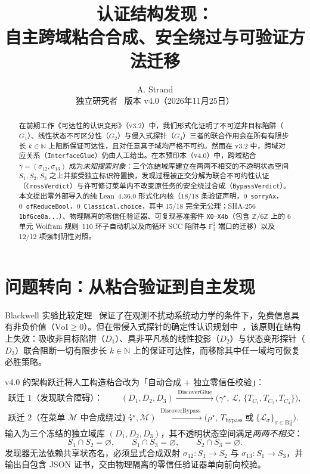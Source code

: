 \documentclass[10pt,a4paper]{article}
\title{\textbf{\Large 认证结构发现：}\\[4pt]
\large 自主跨域粘合合成、安全绕过与可验证方法迁移}
\author{A. Strand\\
\small 独立研究者 \textperiodcentered\ 版本 v4.0（2026年11月25日）}
\date{}
\newcommand{\code}[1]{\nolinkurl{#1}}
\begin{document}
\maketitle

\begin{abstract}
在前期工作《可达性的认识变形》（v3.2）中，我们形式化证明了不可逆非目标陷阱（$G_1$）、线性状态不可区分性（$G_2$）与侵入式探针（$G_4$）三者的联合作用会在所有有限步长 $k \in \mathbb{N}$ 上阻断保证可达性，且对任意真子域均严格不可约。然而在 v3.2 中，跨域对应关系（\code{InterfaceGlue}）仍由人工给出。在本预印本（v4.0）中，跨域粘合 $\gamma = (\sigma_{12}, \sigma_{13})$ 成为\emph{未知搜索对象}：三个冻结域库建立在两两不相交的不透明状态空间 $S_1, S_2, S_3$ 之上并接受独立标识符置换，发现过程被正交分解为联合不可约性认证（\code{CrossVerdict}）与许可修订菜单内不改变原任务的安全绕过合成（\code{BypassVerdict}）。本文提出零外部导入的纯 Lean~4.36.0 形式化内核（18/18 条验证声明，0~\code{sorryAx}，0~\code{ofReduceBool}，0~\code{Classical.choice}，其中 15/18 完全无公理；SHA-256 \code{1bf6ce8a...}）、物理隔离的零信任验证器、可复现基准套件 \texttt{X0}--\texttt{X4b}（包含 $\mathbb{Z}/6\mathbb{Z}$ 上的 6 单元 Wolfram 规则~110 环子自动机以及向循环 SCC 陷阱与 $\mathbb{F}_3^2$ 端口的迁移）以及 12/12 项强制阴性对照。
\end{abstract}

\section{问题转向：从粘合验证到自主发现}

Blackwell 实验比较定理~\cite{blackwell1953,howard1966} 保证了在观测不扰动系统动力学的条件下，免费信息具有非负价值（$\mathrm{VoI} \ge 0$）。但在带侵入式探针的确定性认识规划中~\cite{fagin1995,vanditmarsch2007,kaelbling1998,strand2026v32}，该原则在结构上失效：吸收非目标陷阱（$D_1$）、具非平凡核的线性投影（$D_2$）与状态变形探针（$D_3$）联合阻断一切有限步长 $k \in \mathbb{N}$ 上的保证可达性，而移除其中任一域均可恢复必胜策略。

v4.0 的架构跃迁将人工构造粘合改为「自动合成 + 独立零信任校验」：
\begin{align}\label{eq:pipeline}
\text{跃迁 1（发现联合障碍）：}\quad &
(D_1, D_2, D_3) \xrightarrow{\;\mathrm{DiscoverGlue}\;} \bigl(\gamma^\star,\, \mathcal{L},\, \{T_{C_1}, T_{C_2}, T_{C_4}\}\bigr), \\
\text{跃迁 2（在菜单 $\mathcal{M}$ 中合成绕过）：}\quad &
(\gamma^\star, \mathcal{M}) \xrightarrow{\;\mathrm{DiscoverBypass}\;} \bigl(\rho^\star,\, T_{\mathrm{bypass}} \;\text{或}\; \{\mathcal{L}_\sigma\}_{\sigma \in \mathrm{Bij}}\bigr).
\end{align}
输入为三个冻结的独立域库 $(D_1, D_2, D_3)$，其不透明状态空间满足\emph{两两不相交}：
\[
S_1 \cap S_2 = \varnothing, \qquad S_1 \cap S_3 = \varnothing, \qquad S_2 \cap S_3 = \varnothing.
\]
发现器无法依赖共享状态名，必须显式合成双射 $\sigma_{12}: S_1 \to S_2$ 与 $\sigma_{13}: S_1 \to S_3$，并输出自包含 JSON 证书，交由物理隔离的零信任验证器单向前向校验。
\end{document}
